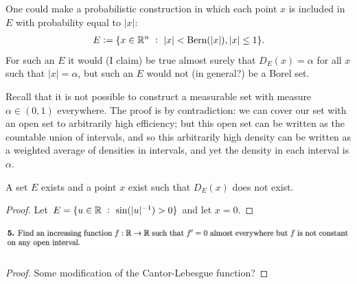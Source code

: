 \begin{enumerate}[label=(\alph*)]
  \begin{remark*}
    One could make a probabilistic construction in which each point $x$ is included in $E$ with
    probability equal to $|x|$:
    \begin{align*}
      E := \{x \in \mathbb{R}^n ~:~ |x| < \text{Bern}(|x|), |x| \leq 1\}.
    \end{align*}
    For such an $E$ it would (I claim) be true almost surely that $D_E(x) = \alpha$ for all $x$ such
    that $|x| = \alpha$, but such an $E$ would not (in general?) be a Borel set.

    Recall that it is not possible to construct a measurable set with measure $\alpha \in (0, 1)$ everywhere.
    The proof is by contradiction: we can cover our set with an open set to arbitrarily high efficiency; but
    this open set can be written as the countable union of intervals, and so this arbitrarily high density can
    be written as a weighted average of densities in intervals, and yet the density in each interval
    is $\alpha$.
  \end{remark*}



  \begin{claim*}
     A set $E$ exists and a point $x$ exist such that $D_E(x)$ does not exist.
  \end{claim*}

  \begin{proof}
    Let $E = \{u \in \mathbb{R} ~:~ \sin(|u|^{-1}) > 0\}$ and let $x = 0$.
  \end{proof}
\end{enumerate}






\newpage
\begin{mdframed}
\includegraphics[width=400pt]{img/analysis--berkeley-202a-hw12-010d.png}
\end{mdframed}

\begin{proof}
  Some modification of the Cantor-Lebesgue function?
\end{proof}